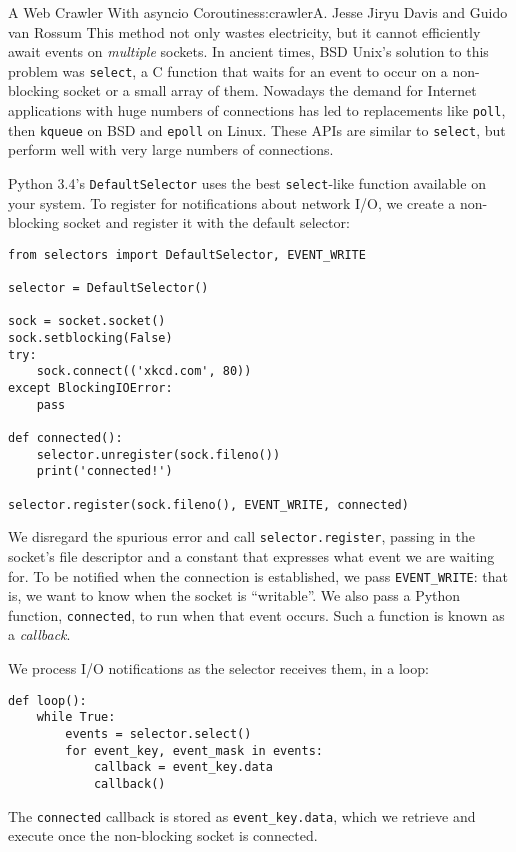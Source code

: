 \begin{aosachapter}{A Web Crawler With asyncio Coroutines}{s:crawler}{A. Jesse Jiryu Davis and Guido van Rossum}
This method not only wastes electricity, but it cannot efficiently await
events on \emph{multiple} sockets. In ancient times, BSD Unix's solution
to this problem was \texttt{select}, a C function that waits for an
event to occur on a non-blocking socket or a small array of them.
Nowadays the demand for Internet applications with huge numbers of
connections has led to replacements like \texttt{poll}, then
\texttt{kqueue} on BSD and \texttt{epoll} on Linux. These APIs are
similar to \texttt{select}, but perform well with very large numbers of
connections.

Python 3.4's \texttt{DefaultSelector} uses the best \texttt{select}-like
function available on your system. To register for notifications about
network I/O, we create a non-blocking socket and register it with the
default selector:

\begin{verbatim}
from selectors import DefaultSelector, EVENT_WRITE

selector = DefaultSelector()

sock = socket.socket()
sock.setblocking(False)
try:
    sock.connect(('xkcd.com', 80))
except BlockingIOError:
    pass

def connected():
    selector.unregister(sock.fileno())
    print('connected!')

selector.register(sock.fileno(), EVENT_WRITE, connected)
\end{verbatim}

We disregard the spurious error and call \texttt{selector.register},
passing in the socket's file descriptor and a constant that expresses
what event we are waiting for. To be notified when the connection is
established, we pass \texttt{EVENT\_WRITE}: that is, we want to know
when the socket is ``writable''. We also pass a Python function,
\texttt{connected}, to run when that event occurs. Such a function is
known as a \emph{callback}.

We process I/O notifications as the selector receives them, in a loop:

\begin{verbatim}
def loop():
    while True:
        events = selector.select()
        for event_key, event_mask in events:
            callback = event_key.data
            callback()
\end{verbatim}

The \texttt{connected} callback is stored as \texttt{event\_key.data},
which we retrieve and execute once the non-blocking socket is connected.


\end{aosachapter}
